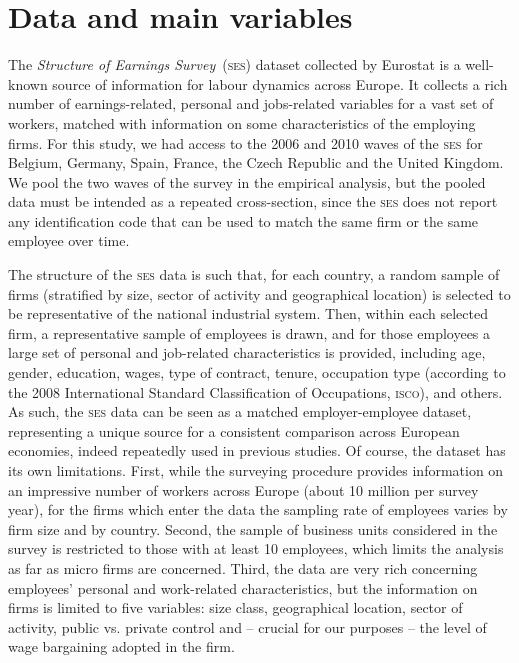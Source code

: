 \documentclass[12pt]{article}
\begin{document}
\section{Data and main variables}
\label{sec:data}

The \emph{Structure of Earnings Survey}~(\textsc{ses}) dataset
collected by Eurostat is a well-known source of information for labour
dynamics across Europe. It collects a rich number of earnings-related,
personal and jobs-related variables for a vast set of workers, matched
with information on some characteristics of the employing firms. For
this study, we had access to the 2006 and 2010 waves of the
\textsc{ses} for Belgium, Germany, Spain, France, the Czech Republic
and the United Kingdom. We pool the two waves of the survey in the
empirical analysis, but the pooled data must be intended as a repeated
cross-section, since the \textsc{ses} does not report any
identification code that can be used to match the same firm or the
same employee over time.

The structure of the \textsc{ses} data is such that, for each country,
a random sample of firms (stratified by size, sector of activity and
geographical location) is selected to be representative of the
national industrial system. Then, within each selected firm, a
representative sample of employees is drawn, and for those employees a
large set of personal and job-related characteristics is provided,
including age, gender, education, wages, type of contract, tenure,
occupation type (according to the 2008 International Standard
Classification of Occupations, \textsc{isco}), and others. As such,
the \textsc{ses} data can be seen as a matched employer-employee
dataset, representing a unique source for a consistent comparison
across European economies, indeed repeatedly used in previous studies.
Of course, the dataset has its own limitations. First, while the
surveying procedure provides information on an impressive number of
workers across Europe (about 10 million per survey year), for the
firms which enter the data the sampling rate of employees varies by
firm size and by country. Second, the sample of business units
considered in the survey is restricted to those with at least 10
employees, which limits the analysis as far as micro firms are
concerned. Third, the data are very rich concerning employees'
personal and work-related characteristics, but the information on
firms is limited to five variables: size class, geographical location,
sector of activity, public vs. private control and -- crucial for our
purposes -- the level of wage bargaining adopted in the firm.
\end{document}
